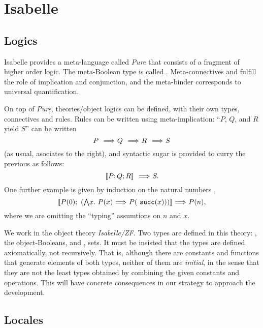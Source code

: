 \section{Isabelle}

\subsection{Logics}

Isabelle provides a meta-language called \emph{Pure} that consists of
a fragment of higher order logic. The meta-Boolean type is called
. Meta-connectives
\isatt{\isasymLongrightarrow} and \isatt{\&\&\&} fulfill the role of
implication and conjunction, and the meta-binder \isatt{\isasymAnd}
corresponds to universal quantification. 

On top of \emph{Pure}, theories/object logics can be defined, with
their own types, connectives and rules. Rules can be written  using
meta-implication: ``$P$, $Q$, and $R$ yield $S$'' can be written
\[
P \ \isatt{\isasymLongrightarrow}\ Q\ \isatt{\isasymLongrightarrow}\ R\ \isatt{\isasymLongrightarrow}\ S
\]
(as usual,  \isatt{\isasymLongrightarrow} asociates to the right), and
syntactic sugar is provided to curry the previous as follows:
\[
\isasymlbrakk P; Q; R \isasymrbrakk \ \isatt{\isasymLongrightarrow}\ S.
\]
One further example is given by induction on the natural numbers
,
\[
\isasymlbrakk P(0);\ (\textstyle\isasymAnd
x.\ P(x)\ \isasymLongrightarrow\ P(\isatt{succ}(x))) \isasymrbrakk
\ \isasymLongrightarrow\ P(n), 
\]
where we are omitting the ``typing'' assumtions on $n$ and $x$.

We work in the object theory \emph{Isabelle/ZF}. Two types are defined
in this theory: \tyo, the object-Booleans, and \tyi,
sets. It must be insisted that the types are defined axiomatically, not
recursively. That is, although there are constants and functions that
generate elements of both types, neither of them are 
\emph{initial}, in the sense that they are not the least types
obtained by combining the given constants and operations. This will
have concrete consequences in our strategy to approach the development.

\subsection{Locales}


